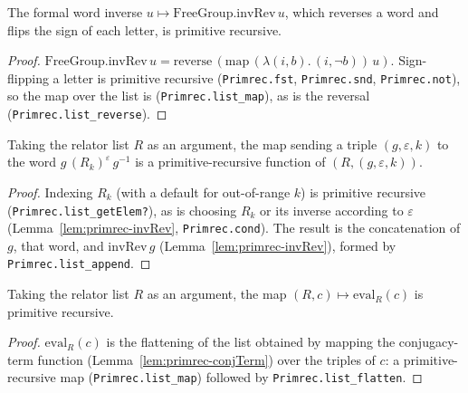 \begin{lemma}
    \label{lem:primrec-invRev}
    \leanok
    The formal word inverse $u \mapsto \mathrm{FreeGroup.invRev}\,u$, which
    reverses a word and flips the sign of each letter, is primitive recursive.
\end{lemma}
\begin{proof}
    $\mathrm{FreeGroup.invRev}\,u = \mathrm{reverse}\,(\mathrm{map}\,(\lambda
    (i,b).\,(i, \lnot b))\,u)$. Sign-flipping a letter is primitive recursive
    (\texttt{Primrec.fst}, \texttt{Primrec.snd}, \texttt{Primrec.not}), so the
    map over the list is (\texttt{Primrec.list\_map}), as is the reversal
    (\texttt{Primrec.list\_reverse}).
\end{proof}

\begin{lemma}
    \label{lem:primrec-conjTerm}
    \leanok
    Taking the relator list $R$ as an argument, the map sending a triple
    $(g, \varepsilon, k)$ to the word $g\,(R_k)^{\varepsilon}\,g^{-1}$ is a
    primitive-recursive function of $(R, (g,\varepsilon,k))$.
\end{lemma}
\begin{proof}
    Indexing $R_k$ (with a default for out-of-range $k$) is primitive recursive
    (\texttt{Primrec.list\_getElem?}), as is choosing $R_k$ or its inverse
    according to $\varepsilon$ (Lemma~\ref{lem:primrec-invRev},
    \texttt{Primrec.cond}). The result is the concatenation of $g$, that word,
    and $\mathrm{invRev}\,g$ (Lemma~\ref{lem:primrec-invRev}), formed by
    \texttt{Primrec.list\_append}.
\end{proof}

\begin{lemma}
    \label{lem:primrec-eval}
    \leanok
    Taking the relator list $R$ as an argument, the map
    $(R, c) \mapsto \mathrm{eval}_R(c)$ is primitive recursive.
\end{lemma}
\begin{proof}
    $\mathrm{eval}_R(c)$ is the flattening of the list obtained by mapping the
    conjugacy-term function (Lemma~\ref{lem:primrec-conjTerm}) over the triples of
    $c$: a primitive-recursive map (\texttt{Primrec.list\_map}) followed by
    \texttt{Primrec.list\_flatten}.
\end{proof}

